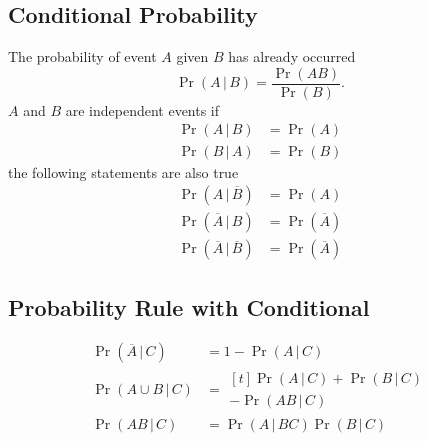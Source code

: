 \documentclass{article}
\begin{document}
\begin{multicols}{3}
    \subsection{Conditional Probability}
    The probability of event \(A\) given \(B\) has already occurred
    \begin{equation*}
        \Pr{\left( A \,\vert\, B \right)} = \frac{\Pr{\left( A B \right)}}{\Pr{\left( B \right)}}.
    \end{equation*}
    \(A\) and \(B\) are independent events if
    \begin{align*}
        \Pr{\left( A \,\vert\, B \right)} & = \Pr{\left( A \right)} \\
        \Pr{\left( B \,\vert\, A \right)} & = \Pr{\left( B \right)}
    \end{align*}
    the following statements are also true
    \begin{align*}
        \Pr{\left( A \,\vert\, \overline{B} \right)}            & = \Pr{\left( A \right)}            \\
        \Pr{\left( \overline{A} \,\vert\, B \right)}            & = \Pr{\left( \overline{A} \right)} \\
        \Pr{\left( \overline{A} \,\vert\, \overline{B} \right)} & = \Pr{\left( \overline{A} \right)}
    \end{align*}
    \subsection{Probability Rule with Conditional}
    \begin{align*}
        \Pr{\left( \overline{A} \,\vert\, C \right)} & = 1 - \Pr{\left( A \,\vert\, C \right)}                                \\
        \Pr{\left( A \cup B \,\vert\, C \right)}     & =
        \begin{aligned}[t]
            \Pr{\left( A \,\vert\, C \right)} + \Pr{\left( B \,\vert\, C \right)} \\
            - \Pr{\left( AB \,\vert\, C \right)}
        \end{aligned}
        \\
        \Pr{\left( A B \,\vert\, C \right)}          & = \Pr{\left( A \,\vert\, BC \right)} \Pr{\left( B \,\vert\, C \right)}
    \end{align*}

\end{multicols}
\end{document}
